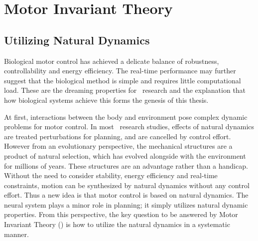 %

\section{Motor Invariant Theory}
\subsection{Utilizing Natural Dynamics}
Biological motor control has achieved a delicate balance of robustness, controllability and energy efficiency.
The real-time performance may further suggest that the biological method  is simple and requires little computational load.
These are the dreaming properties for \cms\ research and  the explanation that how biological systems achieve this  forms the genesis of this thesis.



At first, interactions between the body and environment pose  complex dynamic problems for motor control.
In most \cms\ research studies, effects of natural dynamics are treated  perturbations for planning, and are cancelled by control effort.
However from an evolutionary perspective, the mechanical structures are a product of natural selection, which has evolved alongside with the environment for millions of years. 
These structures are an advantage rather than a handicap. 
Without the need to consider stability, energy efficiency and real-time constraints,   motion can be synthesized by natural dynamics without any control effort.
Thus a new idea is that motor control is based on natural dynamics.
The neural system plays a minor role in planning; it simply utilizes natural dynamic properties.
From this perspective, the key question to be answered by Motor Invariant Theory ({\moit}) is how to utilize the natural dynamics in a systematic manner.









